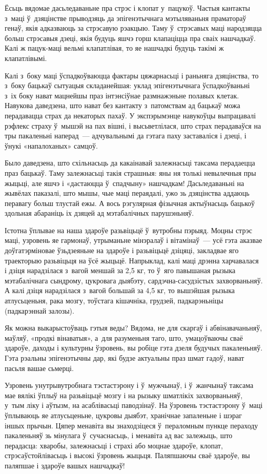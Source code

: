 Ёсьць вядомае дасьледаваньне пра стрэс і клопат у~пацукоў. Частыя кантакты з~маці ў~дзяцінстве прыводзяць да эпігенэтычнага мэтыляваньня праматораў генаў, якія адказваюць за стрэсавую рэакцыю. Таму ў~стрэсавых маці народзяцца больш стрэсавыя дзеці, якія будуць яшчэ горш клапаціцца пра сваіх нашчадкаў. Калі ж пацук-маці вельмі клапатлівая, то яе нашчадкі будуць такімі ж клапатлівымі.

Калі з~боку маці ўспадкоўваюцца фактары цяжарнасьці і раньняга дзяцінства, то з~боку бацькаў сытуацыя складанейшая: уклад эпігенэтычнага ўспадкоўваньні з~іх боку нават мацнейшы праз інтэнсіўнае размнажэньне полавых клетак. Навукова даведзена, што нават без кантакту з~патомствам ад бацькаў можа перадавацца страх да некаторых пахаў. У экспэрымэнце навукоўцы выпрацавалі рэфлекс страху ў~мышэй на пах вішні, і высьветлілася, што страх перадаваўся на тры пакаленьні наперад~--- адчувальнымі да гэтага паху заставаліся і дзеці, і ўнукі «напалоханых» самцоў.

Было даведзена, што схільнасьць да какаінавай залежнасьці таксама перадаецца праз бацькаў. Таму залежнасьці такія страшныя: яны ня толькі невылечныя пры жыцьці, але яшчэ і «дастаюцца ў~спадчыну» нашчадкам! Дасьледаваньні на жывёлах паказалі, што мышы, чые маці пераядалі, ужо зь дзяцінства аддаюць перавагу больш тлустай ежы. А вось рэгулярная фізычная актыўнасьць бацькоў здольная абараніць іх дзяцей ад мэтабалічных парушэньняў.

Істотна ўплывае на наша здароўе разьвіцьцё ў~вутробны пэрыяд. Моцны стрэс маці, узровень яе гармонаў, утрыманьне мінэралаў і вітамінаў~--- усё гэта аказвае доўгатэрміновае ўзьдзеяньне на здароўе і разьвіцьцё дзіцяці, закладвае яго траекторыю разьвіцьця на ўсё жыцьцё. Напрыклад, калі маці дрэнна харчавалася і дзіця нарадзілася з~вагой меншай за 2,5 кг, то ў~яго павышаная рызыка мэтабалічнага сындрому, цукровага дыябэту, сардэчна-сасудзістых захворваньняў. А калі дзіця нарадзілася з~вагой большай за 4,5 кг, то вышэйшая рызыка атлусьценьня, рака мозгу, тоўстага кішачніка, грудзей, падкарэньніцы (падкарэннай залозы).

Як можна выкарыстоўваць гэтыя веды? Вядома, не для скаргаў і абвінавачаньняў, маўляў, «продкі вінаватыя», а~для разуменьня таго, што, умацоўваючы сваё здароўе, даходы і культурны ўзровень, вы робіце гэта дзеля будучых пакаленьняў. Гэта рэальны эпігенэтычны дар, які будзе актуальны праз шмат гадоў, нават пасьля вашае сьмерці.

Узровень унутрывутробнага тэстастэрону і ў~мужчынаў, і ў~жанчынаў таксама мае вялікі ўплыў на разьвіцьцё мозгу і на рызыку шматлікіх захворваньняў, у~тым ліку і аўтызм, на асаблівасьці паводзінаў. На ўзровень тэстастэрону ў~маці ўплываюць яе атлусьценьне, цукровы дыябэт, хранічнае запаленьне і шэраг іншых прычын. Цяпер менавіта вы знаходзіцеся ў~пераломным пункце пераходу пакаленьняў зь мінулага ў~сучаснасьць, і менавіта ад вас залежыць, што перадасца: хваробы, залежнасьці і страхі або моцнае здароўе, клопат, стрэсаўстойлівасьць і высокі ўзровень жыцьця. Паляпшаючы сваё здароўе, вы паляпшае і здароўе вашых нашчадкаў!

